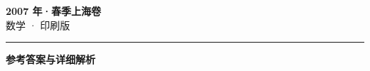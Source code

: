 \documentclass[zihao=5, a4paper]{ctexart}
\begin{document}
\begin{center}
  {\Large\bfseries 2007 年·春季上海卷}\\[4pt]
  {\large 数学 · 印刷版}
\end{center}
\medskip
{}

\par\bigskip\hrule\bigskip
{}
\begin{center}{\large\bfseries 参考答案与详细解析}\end{center}
\smallskip

\end{document}
